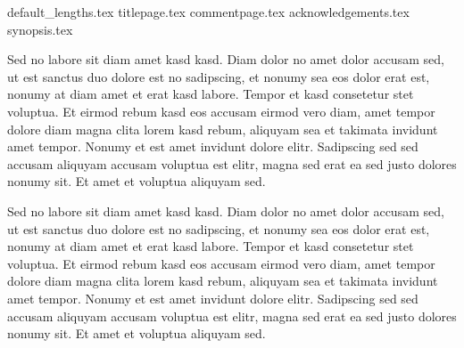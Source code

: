 \documentclass{article}
\begin{document}
	{default_lengths.tex}
	{titlepage.tex}
	{commentpage.tex}
	{acknowledgements.tex}
	{synopsis.tex}

	\newpage
	Sed no labore sit diam amet kasd kasd. Diam dolor no amet dolor accusam sed, ut est sanctus duo dolore est no sadipscing, et nonumy sea eos dolor erat est, nonumy at diam amet et erat kasd labore. Tempor et kasd consetetur stet voluptua. Et eirmod rebum kasd eos accusam eirmod vero diam, amet tempor dolore diam magna clita lorem kasd rebum, aliquyam sea et takimata invidunt amet tempor. Nonumy et est amet invidunt dolore elitr. Sadipscing sed sed accusam aliquyam accusam voluptua est elitr, magna sed erat ea sed justo dolores nonumy sit. Et amet et voluptua aliquyam sed.
	
	Sed no labore sit diam amet kasd kasd. Diam dolor no amet dolor accusam sed, ut est sanctus duo dolore est no sadipscing, et nonumy sea eos dolor erat est, nonumy at diam amet et erat kasd labore. Tempor et kasd consetetur stet voluptua. Et eirmod rebum kasd eos accusam eirmod vero diam, amet tempor dolore diam magna clita lorem kasd rebum, aliquyam sea et takimata invidunt amet tempor. Nonumy et est amet invidunt dolore elitr. Sadipscing sed sed accusam aliquyam accusam voluptua est elitr, magna sed erat ea sed justo dolores nonumy sit. Et amet et voluptua aliquyam sed.
\end{document}
